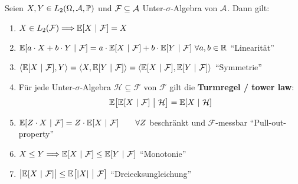\begin{proposition}\enter\label{Prop1.4}
Seien $X,Y\in L_2(\Omega,\mathcal{A},\mathbb{P})$ und $\mathcal{F}\subseteq\mathcal{A}$ Unter-$\sigma$-Algebra von $\mathcal{A}$. Dann gilt:
\begin{enumerate}[label=(\alph*)]
\item $X\in L_2(\mathcal{F})\Longrightarrow\mathbb{E}[X~|~\mathcal{F}]=X$
\item $\mathbb{E}[a\cdot X+b\cdot Y~|~\mathcal{F}]=a\cdot\mathbb{E}[X~|~\mathcal{F}]+b\cdot\mathbb{E}[Y~|~\mathcal{F}]~\forall a,b\in\mathbb{R}$ ``Linearität''
\item $\langle\mathbb{E}[X~|~\mathcal{F}],Y\rangle
=\langle X,\mathbb{E}[Y~|~\mathcal{F}]\rangle
=\langle\mathbb{E}[X~|~\mathcal{F}],\mathbb{E}[Y~|~\mathcal{F}]\rangle$ ``Symmetrie''
\item Für jede Unter-$\sigma$-Algebra $\mathcal{H}\subseteq\mathcal{F}$ von $\mathcal{F}$ gilt die \textbf{Turmregel / tower law}:
\begin{align}\label{Turmregel}
\mathbb{E}\big[\mathbb{E}[X~|~\mathcal{F}]~\big|~\mathcal{H}\big]=\mathbb{E}[X~|~\mathcal{H}]
\end{align}
\item $\mathbb{E}[Z\cdot X~|~\mathcal{F}]=Z\cdot\mathbb{E}[X~|~\mathcal{F}]\qquad\forall Z$ beschränkt und $\mathcal{F}$-messbar ``Pull-out-property''
\item $X\leq Y\Longrightarrow\mathbb{E}[X~|~\mathcal{F}]\leq\mathbb{E}[Y~|~\mathcal{F}]$ ``Monotonie''
\item $\big|\mathbb{E}[X~|~\mathcal{F}]\big|\leq\mathbb{E}\big[|X|~\big|~\mathcal{F}\big]$ ``Dreiecksungleichung''
\end{enumerate}
\end{proposition}

